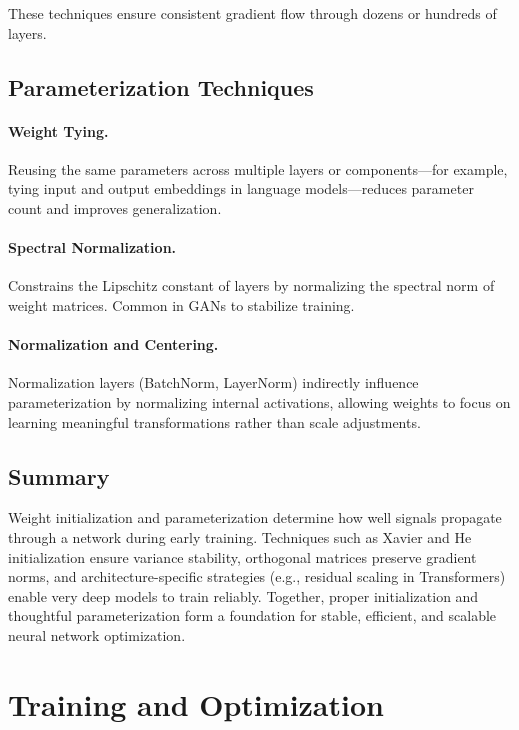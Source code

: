 \documentclass[12pt,a4paper]{report}
\begin{document}
These techniques ensure consistent gradient flow through dozens or hundreds of layers.

\vspace{1em}
\subsection{Parameterization Techniques}

\paragraph{Weight Tying.}
Reusing the same parameters across multiple layers or components—for example, tying input and output embeddings in language models—reduces parameter count and improves generalization.

\paragraph{Spectral Normalization.}
Constrains the Lipschitz constant of layers by normalizing the spectral norm of weight matrices.  
Common in GANs to stabilize training.

\paragraph{Normalization and Centering.}
Normalization layers (BatchNorm, LayerNorm) indirectly influence parameterization by normalizing internal activations, allowing weights to focus on learning meaningful transformations rather than scale adjustments.

\vspace{1em}
\subsection{Summary}

Weight initialization and parameterization determine how well signals propagate through a network during early training.  
Techniques such as Xavier and He initialization ensure variance stability, orthogonal matrices preserve gradient norms, and architecture-specific strategies (e.g., residual scaling in Transformers) enable very deep models to train reliably.  
Together, proper initialization and thoughtful parameterization form a foundation for stable, efficient, and scalable neural network optimization.


\section{Training and Optimization}
\end{document}
